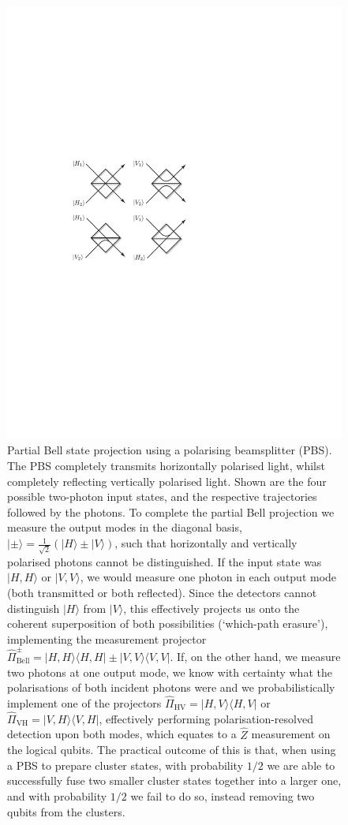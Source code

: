 \documentclass[aps, rmp, twocolumn, amsmath, amssymb, nofootinbib, superscriptaddress, longbibliography, floatfix, table-of-contents, eqsecnum]{revtex4-1}
\newcommand{\bra}[1]{\langle#1|}
\newcommand{\ket}[1]{|#1\rangle}
\begin{document}
\begin{figure}[!htb]
\includegraphics[width=0.75\columnwidth]{partial_bell}
\caption{Partial Bell state projection using a polarising beamsplitter (PBS). The PBS completely transmits horizontally polarised light, whilst completely reflecting vertically polarised light. Shown are the four possible two-photon input states, and the respective trajectories followed by the photons. To complete the partial Bell projection we measure the output modes in the diagonal basis, \mbox{$\ket{\pm} = \frac{1}{\sqrt{2}}(\ket{H}\pm\ket{V})$}, such that horizontally and vertically polarised photons cannot be distinguished. If the input state was $\ket{H,H}$ or $\ket{V,V}$, we would measure one photon in each output mode (both transmitted or both reflected). Since the detectors cannot distinguish $\ket{H}$ from $\ket{V}$, this effectively projects us onto the coherent superposition of both possibilities (`which-path erasure'), implementing the measurement projector \mbox{$\hat\Pi_\text{Bell}^\pm = \ket{H,H}\bra{H,H}\pm\ket{V,V}\bra{V,V}$}. If, on the other hand, we measure two photons at one output mode, we know with certainty what the polarisations of both incident photons were and we probabilistically implement one of the projectors \mbox{$\hat\Pi_
\text{HV}=\ket{H,V}\bra{H,V}$} or \mbox{$\hat\Pi_
\text{VH}=\ket{V,H}\bra{V,H}$}, effectively performing polarisation-resolved detection upon both modes, which equates to a $\hat{Z}$ measurement on the logical qubits. The practical outcome of this is that, when using a PBS to prepare cluster states, with probability $1/2$ we are able to successfully fuse two smaller cluster states together into a larger one, and with probability $1/2$ we fail to do so, instead removing two qubits from the clusters.} \label{fig:partial_bell}
\end{figure}
\end{document}
